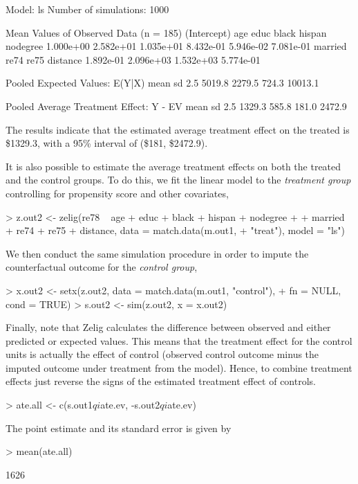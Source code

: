 \begin{enumerate}
\begin{Schunk}
\begin{Soutput}
  Model: ls 
  Number of simulations: 1000 

Mean Values of Observed Data (n = 185) 
(Intercept)         age        educ       black      hispan    nodegree 
  1.000e+00   2.582e+01   1.035e+01   8.432e-01   5.946e-02   7.081e-01 
    married        re74        re75    distance 
  1.892e-01   2.096e+03   1.532e+03   5.774e-01 

Pooled Expected Values: E(Y|X)
   mean      sd    2.5%   97.5% 
 5019.8  2279.5   724.3 10013.1 

Pooled Average Treatment Effect: Y - EV
  mean     sd   2.5%  97.5% 
1329.3  585.8  181.0 2472.9 

\end{Soutput}
\end{Schunk}
The results indicate that the estimated average treatment effect on
the treated is 
\$1329.3,
with a 95\% interval of
(\$181,
\$2472.9).

It is also possible to estimate the average treatment effects on both
the treated and the control groups. To do this, we fit the linear
model to the {\it treatment group} controlling for propensity score
and other covariates,
\begin{Schunk}
\begin{Sinput}
> z.out2 <- zelig(re78 ~ age + educ + black + hispan + nodegree + 
+     married + re74 + re75 + distance, data = match.data(m.out1, 
+     "treat"), model = "ls")
\end{Sinput}
\end{Schunk}
We then conduct the same simulation procedure in order to impute the
counterfactual outcome for the {\it control group},
\begin{Schunk}
\begin{Sinput}
> x.out2 <- setx(z.out2, data = match.data(m.out1, "control"), 
+     fn = NULL, cond = TRUE)
> s.out2 <- sim(z.out2, x = x.out2)
\end{Sinput}
\end{Schunk}
Finally, note that Zelig calculates the difference between observed
and either predicted or expected values.  This means that the
treatment effect for the control units is actually the effect of
control (observed control outcome minus the imputed outcome under
treatment from the model).  Hence, to combine treatment effects just
reverse the signs of the estimated treatment effect of controls.
\begin{Schunk}
\begin{Sinput}
> ate.all <- c(s.out1$qi$ate.ev, -s.out2$qi$ate.ev)
\end{Sinput}
\end{Schunk}
The point estimate and its standard error is given by
\begin{Schunk}
\begin{Sinput}
> mean(ate.all)
\end{Sinput}
\begin{Soutput}
[1] 1626


\end{Soutput}
\end{Schunk}
\end{enumerate}

